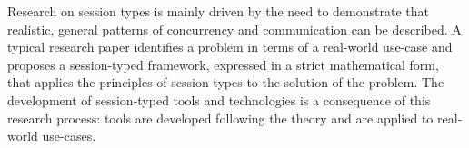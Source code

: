 


Research on session types is mainly driven by the need to demonstrate that realistic, general patterns of concurrency and communication can be described. A typical research paper identifies a problem in terms of a real-world use-case and proposes a session-typed framework, expressed in a strict mathematical form, that applies the principles of session types to the solution of the problem. The development of session-typed tools and technologies is a consequence of this research process: tools are developed following the theory and are applied to real-world use-cases.

